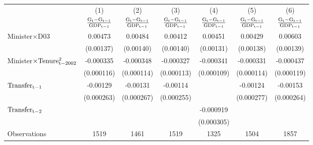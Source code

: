 \documentclass[11pt,a4paper]{article}
\begin{document}
\begin{landscape}
\begin{center}
\begin{scriptsize}
{\begin{tabular}{l*{6}{c}}
\hline\hline
            &\multicolumn{1}{c}{(1)}&\multicolumn{1}{c}{(2)}&\multicolumn{1}{c}{(3)}&\multicolumn{1}{c}{(4)}&\multicolumn{1}{c}{(5)}&\multicolumn{1}{c}{(6)}\\
            &\multicolumn{1}{c}{$\rm \frac{ G_{t}-G_{t-1}}{GDP_{t-1}}$ }&\multicolumn{1}{c}{$\rm \frac{ G_{t}-G_{t-1}}{GDP_{t-1}}$ }&\multicolumn{1}{c}{$\rm \frac{ G_{t}-G_{t-1}}{GDP_{t-1}}$ }&\multicolumn{1}{c}{$\rm \frac{ G_{t}-G_{t-1}}{GDP_{t-1}}$ }&\multicolumn{1}{c}{$\rm \frac{ G_{t}-G_{t-1}}{GDP_{t-1}}$ }&\multicolumn{1}{c}{$\rm \frac{ G_{t}-G_{t-1}}{GDP_{t-1}}$ }\\
\hline
Minister\(\times\)D03      &     0.00473\sym{***}&     0.00484\sym{***}&     0.00412\sym{***}&     0.00451\sym{***}&      0.00429\sym{***}&    0.00603\sym{***}\\
            &   (0.00137)         &   (0.00140)         &   (0.00140)         &   (0.00131)         &   (0.00138)       &    (0.00139)        \\
[1em]
Minister\(\rm \times Tenure_{t-2002}^2 \)       &   -0.000335\sym{***}&   -0.000348\sym{***}&   -0.000327\sym{***}&   -0.000341\sym{***}&   -0.000331\sym{***}&    -0.000437\sym{***}\\
            &  (0.000116)         &  (0.000114)         &  (0.000113)         &  (0.000109)         & (0.000114)         &  (0.000119)         \\
[1em]
   $\rm Transfer_{t-1}$ &    -0.00129\sym{***}&    -0.00131\sym{***}&    -0.00114\sym{***}&                     &      -0.00124\sym{***}    &      -0.00153\sym{***}   \\
            &  (0.000263)         &  (0.000267)         &  (0.000255)         &                     &      (0.000277)     &      (0.000264)        \\
[1em]
   $\rm Transfer_{t-2}$ &                     &                     &                     &   -0.000919\sym{***}&        &     \\
            &                     &                     &                     &  (0.000305)         &          &            \\
\hline
Observations      &        1519         &        1461         &        1519         &        1325         &        1504         &        1857         \\
\hline\hline


\end{tabular}}
\end{scriptsize}
\end{center}
\end{landscape}
\end{document}
